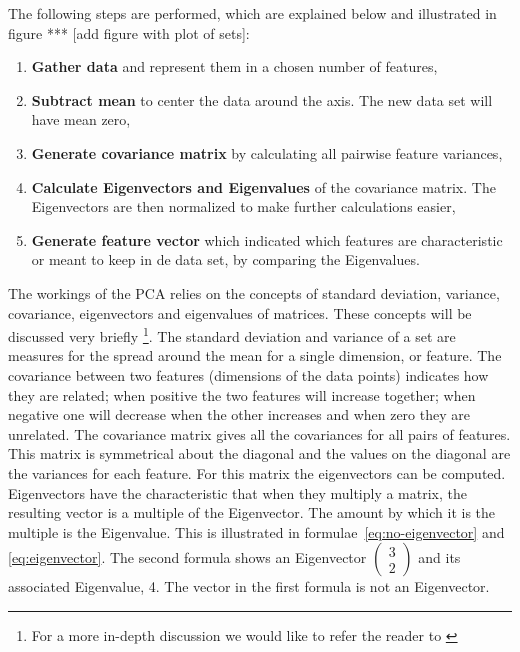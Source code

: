 The following steps are performed, which are explained below and illustrated in figure *** [add figure with plot of sets]:

\begin{enumerate}
	\item \textbf{Gather data} and represent them in a chosen number of features,
	\item \textbf{Subtract mean} to center the data around the axis. The new data set will have mean zero,
	\item \textbf{Generate covariance matrix} by calculating all pairwise feature variances,
	\item \textbf{Calculate Eigenvectors and Eigenvalues} of the covariance matrix.
	The Eigenvectors are then normalized to make further calculations easier,
	\item \textbf{Generate feature vector} which indicated which features are characteristic or meant to keep in de data set, by comparing the Eigenvalues.
\end{enumerate}

The workings of the PCA \cite{smith2002tutorial} relies on the concepts of standard deviation, variance, covariance, eigenvectors and eigenvalues of matrices.
These concepts will be discussed very briefly \footnote{For a more in-depth discussion we would like to refer the reader to \cite{jolliffe2005principal}}.
The standard deviation and variance of a set are measures for the spread around the mean for a single dimension, or feature.
The covariance between two features (dimensions of the data points) indicates how they are related; when positive the two features will increase together; when negative one will decrease when the other increases and when zero they are unrelated.
The covariance matrix gives all the covariances for all pairs of features.
This matrix is symmetrical about the diagonal and the values on the diagonal are the variances for each feature.
For this matrix the eigenvectors can be computed. Eigenvectors have the characteristic that when they multiply a matrix, the resulting vector is a multiple of the Eigenvector.
The amount by which it is the multiple is the Eigenvalue.
This is illustrated in formulae~\ref{eq:no-eigenvector} and \ref{eq:eigenvector}.
The second formula shows an Eigenvector $ \left( \begin{smallmatrix} 3 \\ 2 \end{smallmatrix} \right)$ and its associated Eigenvalue, 4.
The vector in the first formula is not an Eigenvector.

